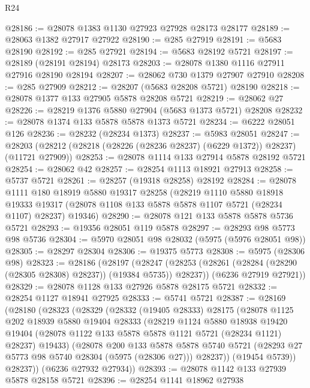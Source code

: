 \begin{lexlean}{R24}
\begin{coremodule}
@28186 := @28078 @1383 @1130 @27923 @27928 @28173 @28177
@28189 := @28063 @1382 @27917 @27922
@28190 := @285 @27919
@28191 := @5683 @28190
@28192 := @285 @27921
@28194 := @5683 @28192 @5721
@28197 := @28189 (@28191 @28194) @28173
@28203 := @28078 @1380 @1116 @27911 @27916 @28190 @28194
@28207 := @28062 @730 @1379 @27907 @27910
@28208 := @285 @27909
@28212 := @28207 (@5683 @28208 @5721) @28190
@28218 := @28078 @1377 @133 @27905 @5878 @28208 @5721
@28219 := @28062 @27
@28226 := @28219 @1376 @5880 @27904 (@5683 @1373 @5721) @28208
@28232 := @28078 @1374 @133 @5878 @5878 @1373 @5721
@28234 := @6222 @28051 @126
@28236 := @28232 (@28234 @1373)
@28237 := @5983 @28051
@28247 := @28203 (@28212 (@28218 (@28226 (@28236 @28237) (@6229 @1372)) @28237) (@11721 @27909))
@28253 := @28078 @1114 @133 @27914 @5878 @28192 @5721
@28254 := @28062 @42
@28257 := @28254 @1113 @18921 @27913
@28258 := @5737 @5721
@28261 := @28257 (@19318 @28258) @28192
@28284 := @28078
    @1111
    @180
    @18919
    @5880
    @19317
    @28258
    (@28219
      @1110
      @5880
      @18918
      @19333
      @19317
      (@28078 @1108 @133 @5878 @5878 @1107 @5721 (@28234 @1107) @28237)
      @19346)
@28290 := @28078 @121 @133 @5878 @5878 @5736 @5721
@28293 := @19356 @28051 @119 @5878
@28297 := @28293 @98 @5773 @98 @5736
@28304 := @5970 @28051 @98 @28032 (@5975 (@5976 @28051 @98))
@28305 := @28297 @28304
@28306 := @19375 @5773
@28308 := @5975 (@28306 @98)
@28323 := @28186
    (@28197
      (@28247 (@28253 (@28261 (@28284 (@28290 (@28305 @28308) @28237)) (@19384 @5735)) @28237))
      (@6236 @27919 @27921))
@28329 := @28078 @1128 @133 @27926 @5878 @28175 @5721
@28332 := @28254 @1127 @18941 @27925
@28333 := @5741 @5721
@28387 := @28169
    (@28180
      (@28323
        (@28329
          (@28332
            (@19405 @28333)
            @28175
            (@28078
              @1125
              @202
              @18939
              @5880
              @19404
              @28333
              (@28219
                @1124
                @5880
                @18938
                @19420
                @19404
                (@28078 @1122 @133 @5878 @5878 @1121 @5721 (@28234 @1121) @28237)
                @19433)
              (@28078
                @200
                @133
                @5878
                @5878
                @5740
                @5721
                (@28293 @27 @5773 @98 @5740 @28304 (@5975 (@28306 @27)))
                @28237))
            (@19454 @5739))
          @28237))
      (@6236 @27932 @27934))
@28393 := @28078 @1142 @133 @27939 @5878 @28158 @5721
@28396 := @28254 @1141 @18962 @27938

\end{coremodule}
\end{lexlean}
